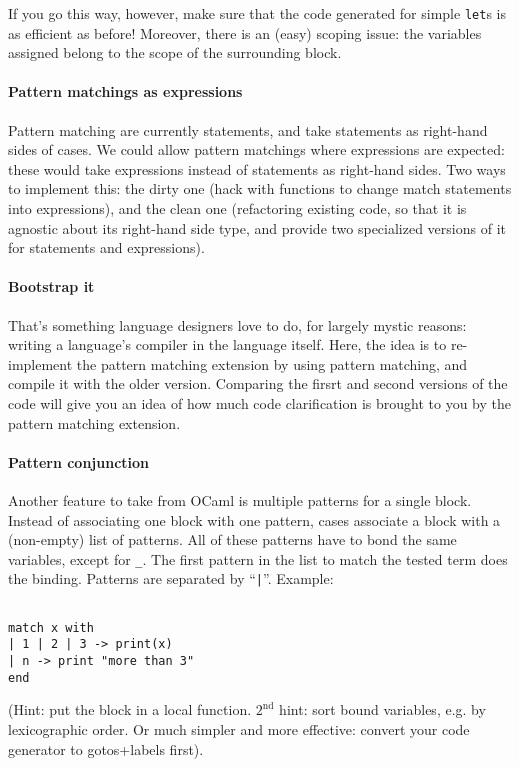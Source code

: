 If you go this way, however, make sure that the code generated for
simple {\tt let}s is as efficient as before! Moreover, there is an (easy) 
scoping issue: the variables assigned belong to the scope of the
surrounding block.

\paragraph{Pattern matchings as expressions}
Pattern matching are currently statements, and take statements as
right-hand sides of cases. We could allow pattern matchings where
expressions are expected: these would take expressions instead of
statements as right-hand sides. Two ways to implement this: the dirty
one (hack with functions to change match statements into expressions),
and the clean one (refactoring existing code, so that it is agnostic
about its right-hand side type, and provide two specialized
versions of it for statements and expressions).

\paragraph{Bootstrap it}
That's something language designers love to do, for largely mystic
reasons: writing a language's compiler in the language itself. Here,
the idea is to re-implement the pattern matching extension by using
pattern matching, and compile it with the older version. Comparing the
firsrt and second versions of the code will give you an idea of how
much code clarification is brought to you by the pattern matching
extension.

\paragraph{Pattern conjunction} Another feature to take from OCaml is
multiple patterns for a single block. Instead of associating one
block with one pattern, cases associate a block with a (non-empty)
list of patterns. All of these patterns have to bond the same
variables, except for {\tt\_}. The first pattern in the list to match
the tested term does the binding. Patterns are separated by
``\verb+|+''. Example:
\begin{Verbatim}[fontsize=\scriptsize]

match x with
| 1 | 2 | 3 -> print(x)
| n -> print "more than 3"
end
\end{Verbatim}
(Hint: put the block in a local function. $2^{\mathrm{nd}}$ hint: sort
bound variables, e.g. by lexicographic order. Or much simpler and
more effective: convert your code generator to gotos+labels first).

